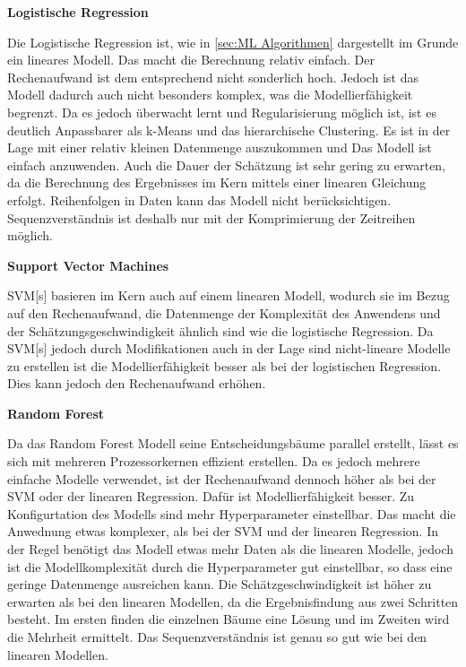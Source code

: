 \textbf{Logistische Regression}\par
Die Logistische Regression ist, wie in \autoref{sec:ML Algorithmen} dargestellt im Grunde ein lineares Modell. Das macht die Berechnung relativ einfach. Der Rechenaufwand ist dem entsprechend nicht sonderlich hoch. Jedoch ist das Modell dadurch auch nicht besonders komplex, was die Modellierfähigkeit begrenzt. Da es jedoch überwacht lernt und Regularisierung möglich ist, ist es deutlich Anpassbarer als k-Means und das hierarchische Clustering. Es ist in der Lage mit einer relativ kleinen Datenmenge auszukommen und Das Modell ist einfach anzuwenden. Auch die Dauer der Schätzung ist sehr gering zu erwarten, da die Berechnung des Ergebnisses im Kern mittels einer linearen Gleichung erfolgt. Reihenfolgen in Daten kann das Modell nicht berücksichtigen. Sequenzverständnis ist deshalb nur mit der Komprimierung der Zeitreihen möglich.\dubpar

\textbf{Support Vector Machines}\par
\acrshort{SVM}[s] basieren im Kern auch auf einem linearen Modell, wodurch sie im Bezug auf den Rechenaufwand, die Datenmenge der Komplexität des Anwendens und der Schätzungsgeschwindigkeit ähnlich sind wie die logistische Regression. Da \acrshort{SVM}[s] jedoch durch Modifikationen auch in der Lage sind nicht-lineare Modelle zu erstellen ist die Modellierfähigkeit besser als bei der logistischen Regression. Dies kann jedoch den Rechenaufwand erhöhen.\dubpar

\textbf{Random Forest}\par
Da das Random Forest Modell seine Entscheidungsbäume parallel erstellt, lässt es sich mit mehreren Prozessorkernen effizient erstellen. Da es jedoch mehrere einfache Modelle verwendet, ist der Rechenaufwand dennoch höher als bei der \acrshort{SVM} oder der linearen Regression. Dafür ist Modellierfähigkeit besser. Zu Konfigurtation des Modells sind mehr Hyperparameter einstellbar. Das macht die Anwednung etwas komplexer, als bei der SVM und der linearen Regression. In der Regel benötigt das Modell etwas mehr Daten als die linearen Modelle, jedoch ist die Modellkomplexität durch die Hyperparameter gut einstellbar, so dass eine geringe Datenmenge ausreichen kann. Die Schätzgeschwindigkeit ist höher zu erwarten als bei den linearen Modellen, da die Ergebnisfindung aus zwei Schritten besteht. Im ersten finden die einzelnen Bäume eine Lösung und im Zweiten wird die Mehrheit ermittelt. Das Sequenzverständnis ist genau so gut wie bei den linearen Modellen.\dubpar

